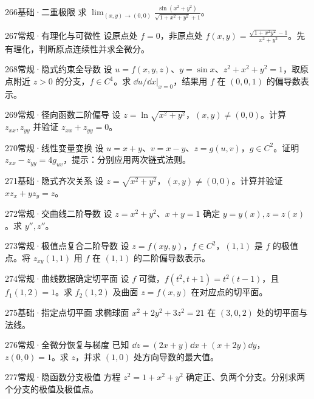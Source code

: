 \begin{exercise}{266}{基础·二重极限}
求 $\lim_{(x,y)\to(0,0)}\frac{\sin(x^2+y^2)}{\sqrt{1+x^2+y^2}+1}$。
\end{exercise}
\begin{exercise}{267}{常规·有理化与可微性}
设原点处 $f=0$，非原点处 $f(x,y)=\frac{\sqrt{1+x^2y^2}-1}{x^2+y^2}$。先有理化，判断原点连续性并求全微分。
\end{exercise}
\begin{exercise}{268}{常规·隐式约束全导数}
设 $u=f(x,y,z)$、$y=\sin x$、$z^2+x^2+y^2=1$，取原点附近 $z>0$ 的分支，$f\in C^1$。求 $\dd u/\dd x|_{x=0}$，结果用 $f$ 在 $(0,0,1)$ 的偏导数表示。
\end{exercise}
\begin{exercise}{269}{常规·径向函数二阶偏导}
设 $z=\ln\sqrt{x^2+y^2}$，$(x,y)\ne(0,0)$。计算 $z_{xx},z_{yy}$ 并验证 $z_{xx}+z_{yy}=0$。
\end{exercise}
\begin{exercise}{270}{常规·线性变量变换}
设 $u=x+y$、$v=x-y$、$z=g(u,v)$，$g\in C^2$。证明 $z_{xx}-z_{yy}=4g_{uv}$，提示：分别应用两次链式法则。
\end{exercise}
\begin{exercise}{271}{基础·隐式齐次关系}
设 $z=\sqrt{x^2+y^2}$，$(x,y)\ne(0,0)$。计算并验证 $xz_x+yz_y=z$。
\end{exercise}
\begin{exercise}{272}{常规·交曲线二阶导数}
设 $z=x^2+y^2$、$x+y=1$ 确定 $y=y(x),z=z(x)$。求 $y'',z''$。
\end{exercise}
\begin{exercise}{273}{常规·极值点复合二阶导数}
设 $z=f(xy,y)$，$f\in C^2$，$(1,1)$ 是 $f$ 的极值点。将 $z_{xy}(1,1)$ 用 $f$ 在 $(1,1)$ 的二阶偏导数表示。
\end{exercise}
\begin{exercise}{274}{常规·曲线数据确定切平面}
设 $f$ 可微，$f(t^2,t+1)=t^2(t-1)$，且 $f_1(1,2)=1$。求 $f_2(1,2)$ 及曲面 $z=f(x,y)$ 在对应点的切平面。
\end{exercise}
\begin{exercise}{275}{基础·指定点切平面}
求椭球面 $x^2+2y^2+3z^2=21$ 在 $(3,0,2)$ 处的切平面与法线。
\end{exercise}
\begin{exercise}{276}{常规·全微分恢复与梯度}
已知 $\dd z=(2x+y)\dd x+(x+2y)\dd y$，$z(0,0)=1$。求 $z$，并求 $(1,0)$ 处方向导数的最大值。
\end{exercise}
\begin{exercise}{277}{常规·隐函数分支极值}
方程 $z^2=1+x^2+y^2$ 确定正、负两个分支。分别求两个分支的极值及极值点。
\end{exercise}
